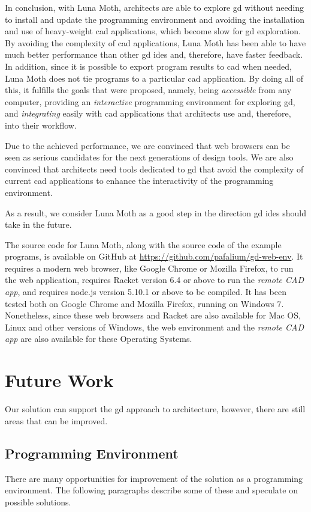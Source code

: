 In conclusion, with Luna Moth, architects are able to explore \gls{gd} without needing to install and update the programming environment and avoiding the installation and use of heavy-weight \gls{cad} applications, which become slow for \gls{gd} exploration.
By avoiding the complexity of \gls{cad} applications, Luna Moth has been able to have much better performance than other \gls{gd} \glspl{ide} and, therefore, have faster feedback.
In addition, since it is possible to export program results to \gls{cad} when needed, Luna Moth does not tie programs to a particular \gls{cad} application.
By doing all of this, it fulfills the goals that were proposed, namely, being \textit{accessible} from any computer, providing an \textit{interactive} programming environment for exploring \gls{gd}, and \textit{integrating} easily with \gls{cad} applications that architects use and, therefore, into their workflow.

Due to the achieved performance, we are convinced that web browsers can be seen as serious candidates for the next generations of design tools.
We are also convinced that architects need tools dedicated to \gls{gd} that avoid the complexity of current \gls{cad} applications to enhance the interactivity of the programming environment.

As a result, we consider Luna Moth as a good step in the direction \gls{gd} \glspl{ide} should take in the future.

The source code for Luna Moth, along with the source code of the example programs, is available on GitHub at \url{https://github.com/pafalium/gd-web-env}.
It requires a modern web browser, like Google Chrome or Mozilla Firefox, to run the web application, requires Racket version 6.4 or above to run the \textit{remote CAD app}, and requires node.js version 5.10.1 or above to be compiled.
It has been tested both on Google Chrome and Mozilla Firefox, running on Windows 7.
Nonetheless, since these web browsers and Racket are also available for Mac OS, Linux and other versions of Windows, the web environment and the \textit{remote CAD app} are also available for these Operating Systems.


\section{Future Work}
Our solution can support the \gls{gd} approach to architecture, however, there are still areas that can be improved.


\subsection{Programming Environment}
There are many opportunities for improvement of the solution as a programming environment.
The following paragraphs describe some of these and speculate on possible solutions.

